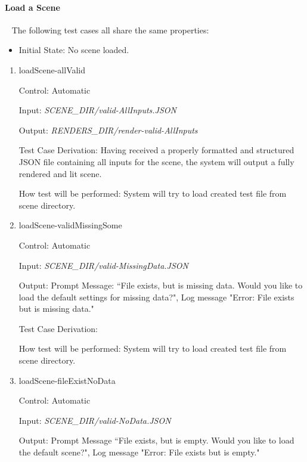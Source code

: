 \documentclass[12pt, titlepage]{article}
\begin{document}
\paragraph{Load a Scene}
~\newline
The following test cases all share the same properties:

\begin{itemize}
	\item[] Initial State: No scene loaded.
\end{itemize}

\begin{enumerate}

\item{loadScene-allValid\\}

Control: Automatic
								
Input: \textit{SCENE\_DIR/valid-AllInputs.JSON}
					
Output: \textit{RENDERS\_DIR/render-valid-AllInputs}

Test Case Derivation: Having received a properly formatted and structured JSON 
file containing all inputs for the scene, the system will output a fully 
rendered and lit scene.
					
How test will be performed: System will try to load created test file from 
scene directory.
					
\item{loadScene-validMissingSome\\}

Control: Automatic

Input: \textit{SCENE\_DIR/valid-MissingData.JSON}

Output: Prompt Message: ``File exists, but is missing data. Would you like to 
load the default settings for missing data?", Log message "Error: File exists 
but is missing data."

Test Case Derivation: 

How test will be performed: System will try to load created test file from 
scene directory.

\item{loadScene-fileExistNoData\\}

Control: Automatic
									
Input: \textit{SCENE\_DIR/valid-NoData.JSON}

Output: Prompt Message ``File exists, but is empty. Would you like to load the 
default scene?", Log message "Error: File exists but is empty."


\end{enumerate}
\end{document}
